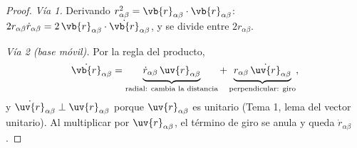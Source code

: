 \begin{proof}
\emph{Vía 1.} Derivando $r_{\alpha\beta}^{2}=\vb{r}_{\alpha\beta}\cdot\vb{r}_{\alpha\beta}$:
$2r_{\alpha\beta}\dot r_{\alpha\beta}=2\,\vb{r}_{\alpha\beta}\cdot\dot{\vb{r}}_{\alpha\beta}$, y se divide entre $2r_{\alpha\beta}$.

\noindent\emph{Vía 2 (base móvil).} Por la regla del producto,
\begin{equation}
  \dot{\vb{r}}_{\alpha\beta}=\underbrace{\dot r_{\alpha\beta}\,\uv{r}_{\alpha\beta}}_{\text{radial: cambia la distancia}}
  +\underbrace{r_{\alpha\beta}\,\dot{\uv{r}}_{\alpha\beta}}_{\text{perpendicular: giro}} ,
  \label{eq:radial-giro}
\end{equation}
y $\dot{\uv{r}}_{\alpha\beta}\perp\uv{r}_{\alpha\beta}$ porque $\uv{r}_{\alpha\beta}$ es unitario (Tema 1, lema del vector
unitario). Al multiplicar por $\uv{r}_{\alpha\beta}$, el término de giro se anula y queda $\dot r_{\alpha\beta}$.
\end{proof}

